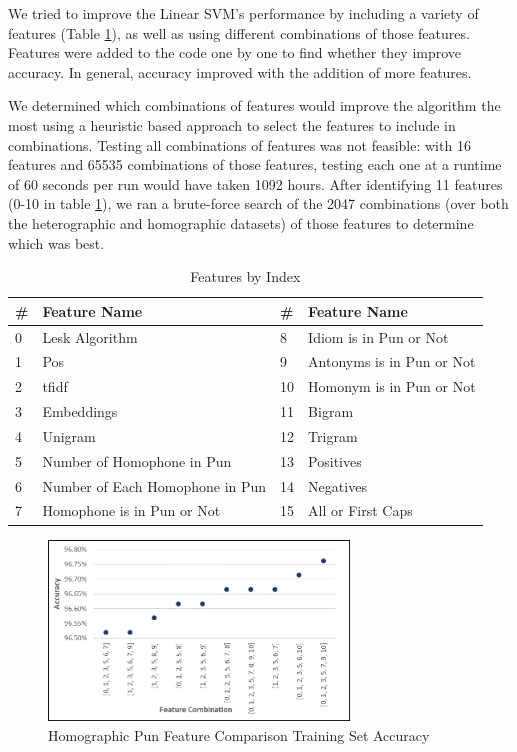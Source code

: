 \documentclass{article}
\begin{document}
We tried to improve the Linear SVM's performance by including a variety of
features (Table \ref{tab:List_of_features}), as well as using different
combinations of those features.  Features were added to the code one by one to
find whether they improve accuracy. In general, accuracy improved with the
addition of more features.

We determined which combinations of features would improve the algorithm the
most using a heuristic based approach to select the features to include in
combinations. Testing all combinations of features was not feasible: with 16
features and 65535 combinations of those features, testing each one at a runtime
of 60 seconds per run would have taken 1092 hours. After identifying 11
features (0-10 in table \ref{tab:List_of_features}), we ran a brute-force search
of the 2047 combinations (over both the heterographic and homographic datasets)
of those features to determine which was best.

\begin{table}
\caption{Features by Index}\label{tab:List_of_features} 
\begin{center}
\begin{tabular}{l l l l} 
\toprule
\textbf{\#} &\textbf{Feature Name}		& \textbf{\#} &	\textbf{Feature Name}\\
\midrule
0	&	Lesk Algorithm					& 8		&	Idiom is in Pun or Not\\
1	&	Pos								& 9		&	Antonyms is in Pun or Not\\
2	&	tfidf							& 10	&	Homonym is in Pun or Not\\
3	&	Embeddings						& 11	&	Bigram\\
4	&	Unigram							& 12	&	Trigram\\
5	&	Number of Homophone in Pun		& 13	&	Positives\\
6	&	Number of Each Homophone in Pun & 14	&	Negatives\\
7	&	Homophone is in Pun or Not		& 15	&	All or First Caps\\
\bottomrule
\end{tabular}
\end{center}
\end{table}

\begin{figure}
  \centering
  \includegraphics[width=8cm]{figures/Accuracy_on_Training_Set_for_Homographic_Pun.png}
  \caption{Homographic Pun Feature Comparison Training Set Accuracy}\label{fig:ACC_Train_Homo}
\end{figure}
\end{document}
